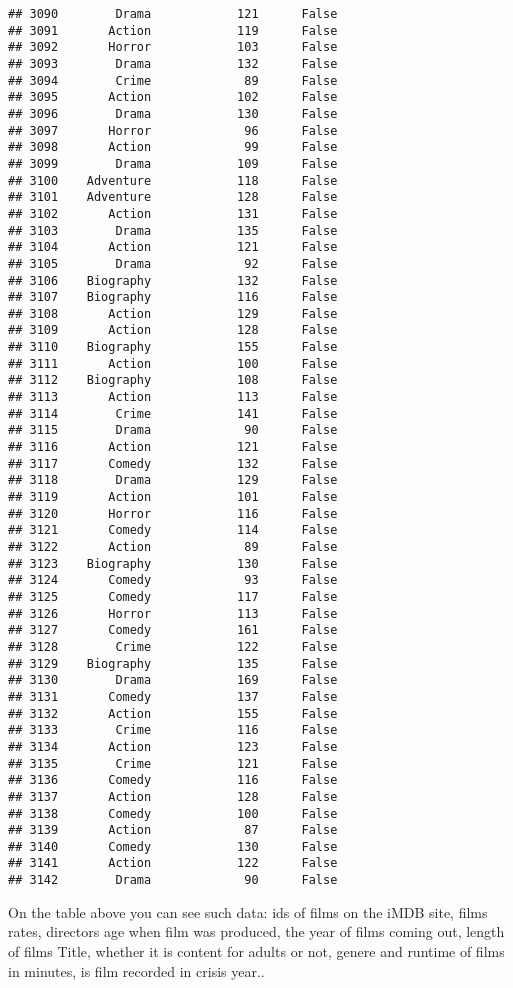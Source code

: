 \documentclass[
]{article}
\begin{document}
\begin{verbatim}
## 3090        Drama            121      False
## 3091       Action            119      False
## 3092       Horror            103      False
## 3093        Drama            132      False
## 3094        Crime             89      False
## 3095       Action            102      False
## 3096        Drama            130      False
## 3097       Horror             96      False
## 3098       Action             99      False
## 3099        Drama            109      False
## 3100    Adventure            118      False
## 3101    Adventure            128      False
## 3102       Action            131      False
## 3103        Drama            135      False
## 3104       Action            121      False
## 3105        Drama             92      False
## 3106    Biography            132      False
## 3107    Biography            116      False
## 3108       Action            129      False
## 3109       Action            128      False
## 3110    Biography            155      False
## 3111       Action            100      False
## 3112    Biography            108      False
## 3113       Action            113      False
## 3114        Crime            141      False
## 3115        Drama             90      False
## 3116       Action            121      False
## 3117       Comedy            132      False
## 3118        Drama            129      False
## 3119       Action            101      False
## 3120       Horror            116      False
## 3121       Comedy            114      False
## 3122       Action             89      False
## 3123    Biography            130      False
## 3124       Comedy             93      False
## 3125       Comedy            117      False
## 3126       Horror            113      False
## 3127       Comedy            161      False
## 3128        Crime            122      False
## 3129    Biography            135      False
## 3130        Drama            169      False
## 3131       Comedy            137      False
## 3132       Action            155      False
## 3133        Crime            116      False
## 3134       Action            123      False
## 3135        Crime            121      False
## 3136       Comedy            116      False
## 3137       Action            128      False
## 3138       Comedy            100      False
## 3139       Action             87      False
## 3140       Comedy            130      False
## 3141       Action            122      False
## 3142        Drama             90      False
\end{verbatim}

On the table above you can see such data: ids of films on the iMDB site,
films rates, directors age when film was produced, the year of films
coming out, length of films Title, whether it is content for adults or
not, genere and runtime of films in minutes, is film recorded in crisis
year..
\end{document}
